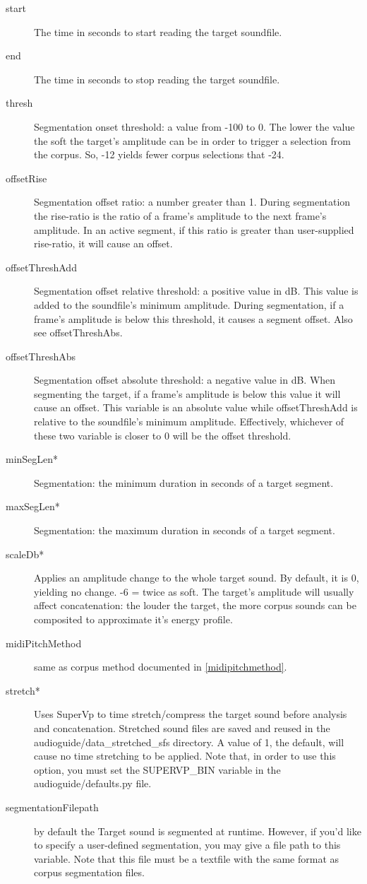 \documentclass{article}
\begin{document}
\begin{spacing}{1.2}
\begin{description}
\item[start] The time in seconds to start reading the target soundfile.
\item[end] The time in seconds to stop reading the target soundfile.  
\item[thresh] Segmentation onset threshold: a value from -100 to 0.  The lower the value the soft the target's amplitude can be in order to trigger a selection from the corpus.  So, -12 yields fewer corpus selections that -24.  
\item[offsetRise] Segmentation offset ratio: a number greater than 1.   During segmentation the rise-ratio is the ratio of a frame's amplitude to the next frame's amplitude.   In an active segment, if this ratio is greater than user-supplied rise-ratio, it will cause an offset.
\item[offsetThreshAdd] Segmentation offset relative threshold: a positive value in dB.  
This value is added to the soundfile's minimum amplitude.  During segmentation, if a frame's amplitude is below this threshold, it causes a segment offset.  Also see offsetThreshAbs.
\item[offsetThreshAbs] Segmentation offset absolute threshold: a negative value in dB.  When segmenting the target, if a frame's amplitude is below this value it will cause an offset.  This variable is an absolute value while offsetThreshAdd is relative to the soundfile's minimum amplitude.  Effectively, whichever of these two variable is closer to 0 will be the offset threshold.
\item[minSegLen*] Segmentation: the minimum duration in seconds of a target segment.
\item[maxSegLen*] Segmentation: the maximum duration in seconds of a target segment.

\item[scaleDb*] Applies an amplitude change to the whole target sound. By default, it is 0, yielding no change. -6 = twice as soft.  The target's amplitude will usually affect concatenation: the louder the target, the more corpus sounds can be composited to approximate it's energy profile.

\item[midiPitchMethod] same as corpus method documented in \ref{midipitchmethod}.
\item[stretch*] Uses SuperVp to time stretch/compress the target sound before analysis and concatenation.  Stretched sound files are saved and reused in the audioguide/data\_stretched\_sfs directory.  A value of 1, the default, will cause no time stretching to be applied.  Note that, in order to use this option, you must set the SUPERVP\_BIN variable in the audioguide/defaults.py file.
\item[segmentationFilepath] by default the Target sound is segmented at runtime.  However, if you'd like to specify a user-defined segmentation, you may give a file path to this variable.  Note that this file must be a textfile with the same format as corpus segmentation files.
\end{description}



\end{spacing}
\end{document}
